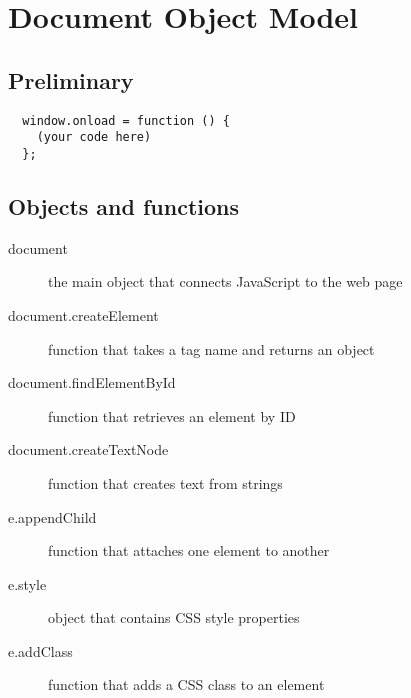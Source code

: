 \documentclass[letterpage,foldmark,10pt]{leaflet}
\begin{document}
\section{Document Object Model}
\subsection{Preliminary}
\begin{verbatim}
  window.onload = function () {
    (your code here)
  };
\end{verbatim}
\subsection{Objects and functions}
\begin{description}
  \item [document] the main object that connects JavaScript to the web page
  \item [document.createElement] function that takes a tag name and returns an object
  \item [document.findElementById] function that retrieves an element by ID
  \item [document.createTextNode] function that creates text from strings
  \item [e.appendChild] function that attaches one element to another
  \item [e.style] object that contains CSS style properties
  \item [e.addClass] function that adds a CSS class to an element
\end{description}
\end{document}
